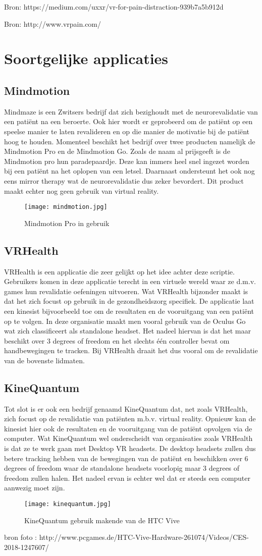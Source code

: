 Bron: https://medium.com/uxxr/vr-for-pain-distraction-939b7a5b912d

Bron: http://www.vrpain.com/


\section{Soortgelijke applicaties}
\subsection{Mindmotion}
Mindmaze is een Zwitsers bedrijf dat zich bezighoudt met de neurorevalidatie van een patiënt na een beroerte. Ook hier wordt er geprobeerd om de patiënt op een speelse manier te laten revalideren en op die manier de motivatie bij de patiënt hoog te houden. Momenteel beschikt het bedrijf over twee producten namelijk de Mindmotion Pro en de Mindmotion Go. Zoals de naam al prijsgeeft is de Mindmotion pro hun paradepaardje. Deze kan immers heel snel ingezet worden bij een patiënt na het oplopen van een letsel. Daarnaast ondersteunt het ook nog eens mirror therapy wat de neurorevalidatie dus zeker bevordert. Dit product maakt echter nog geen gebruik van virtual reality.

\begin{figure}[h]
    \centering
    \texttt{[image: mindmotion.jpg]}
    \caption{Mindmotion Pro in gebruik}
\end{figure}

\subsection{VRHealth}
VRHealth is een applicatie die zeer gelijkt op het idee achter deze scriptie. Gebruikers komen in deze applicatie terecht in een virtuele wereld waar ze d.m.v. games hun revalidatie oefeningen uitvoeren. Wat VRHealth bijzonder maakt is dat het zich focust op gebruik in de gezondheidszorg specifiek. De applicatie laat een kinesist bijvoorbeeld toe om de resultaten en de vooruitgang van een patiënt op te volgen. In deze organisatie maakt men vooral gebruik van de Oculus Go wat zich classificeert als standalone headset. Het nadeel hiervan is dat het maar beschikt over 3 degrees of freedom en het slechts één controller bevat om handbewegingen te tracken. Bij VRHealth draait het dus vooral om de revalidatie van de bovenste lidmaten. 

\subsection{KineQuantum}
Tot slot is er ook een bedrijf genaamd KineQuantum dat, net zoals VRHealth, zich focust op de revalidatie van patiënten m.b.v. virtual reality. Opnieuw kan de kinesist hier ook de resultaten en de vooruitgang van de patiënt opvolgen via de computer. Wat KineQuantum wel onderscheidt van organisaties zoals VRHealth is dat ze te werk gaan met Desktop VR headsets. De desktop headsets zullen dus betere tracking hebben van de bewegingen van de patiënt en beschikken over 6 degrees of freedom waar de standalone headsets voorlopig maar 3 degrees of freedom zullen halen. Het nadeel ervan is echter wel dat er steeds een computer aanwezig moet zijn. 

\begin{figure}[h]
    \centering
    \texttt{[image: kinequantum.jpg]}
    \caption{KineQuantum gebruik makende van de HTC Vive}
\end{figure}
bron foto : http://www.pcgames.de/HTC-Vive-Hardware-261074/Videos/CES-2018-1247607/